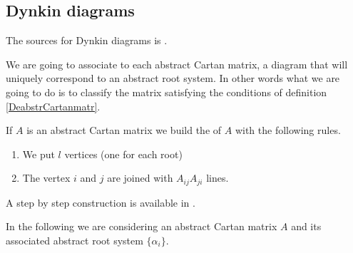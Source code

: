 \subsection{Dynkin diagrams}
\label{SubsecDynkindiam}

The sources for Dynkin diagrams is \cite{SternLieAlgebra,Wisser}.

We are going to associate to each abstract Cartan matrix, a diagram that will uniquely correspond to an abstract root system. In other words what we are going to do is to classify the matrix satisfying the conditions of definition \ref{DeabstrCartanmatr}.

If \( A\) is an abstract Cartan matrix we build the  of \( A\) with the following rules.
\begin{enumerate}
    \item
        We put \( l\) vertices (one for each root)
    \item
        The vertex \( i\) and \( j\) are joined with \( A_{ij}A_{ji}\) lines.
\end{enumerate}
A step by step construction is available in \cite{Wisser}.

In the following we are considering an abstract Cartan matrix \( A\) and its associated abstract root system \( \{ \alpha_i \}\).

